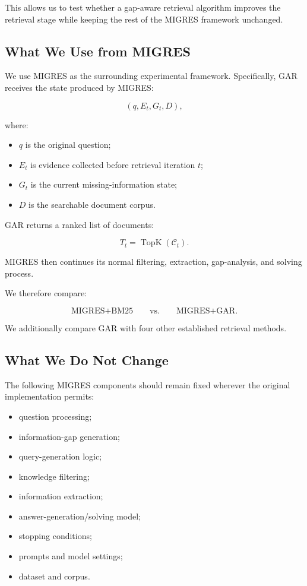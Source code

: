 \documentclass[11pt,a4paper]{article}
\begin{document}
This allows us to test whether a gap-aware retrieval algorithm improves the retrieval stage while keeping the rest of the MIGRES framework unchanged.

\subsection{What We Use from MIGRES}

We use MIGRES as the surrounding experimental framework. Specifically, GAR receives the state produced by MIGRES:

\[
(q,E_t,G_t,D),
\]

where:

\begin{itemize}[leftmargin=1.5em]
\item $q$ is the original question;
\item $E_t$ is evidence collected before retrieval iteration $t$;
\item $G_t$ is the current missing-information state;
\item $D$ is the searchable document corpus.
\end{itemize}

GAR returns a ranked list of documents:

\[
T_t=\operatorname{TopK}(\mathcal{C}_t).
\]

MIGRES then continues its normal filtering, extraction, gap-analysis, and solving process.

We therefore compare:

\[
\boxed{\text{MIGRES+BM25}}
\qquad\text{vs.}\qquad
\boxed{\text{MIGRES+GAR}}.
\]

We additionally compare GAR with four other established retrieval methods.

\subsection{What We Do Not Change}

The following MIGRES components should remain fixed wherever the original implementation permits:

\begin{itemize}[leftmargin=1.5em]
\item question processing;
\item information-gap generation;
\item query-generation logic;
\item knowledge filtering;
\item information extraction;
\item answer-generation/solving model;
\item stopping conditions;
\item prompts and model settings;
\item dataset and corpus.
\end{itemize}
\end{document}
